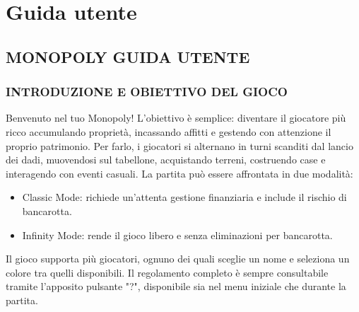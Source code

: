 \appendix
\chapter{Guida utente}
\section{MONOPOLY \- GUIDA UTENTE}
\subsection{INTRODUZIONE E OBIETTIVO DEL GIOCO}
Benvenuto nel tuo Monopoly!\newline
L’obiettivo è semplice: diventare il giocatore più ricco accumulando proprietà, incassando affitti e gestendo con attenzione il proprio patrimonio.
Per farlo, i giocatori si alternano in turni scanditi dal lancio dei dadi, muovendosi sul tabellone, acquistando terreni, costruendo case e interagendo con eventi casuali.\newline
La partita può essere affrontata in due modalità:\newline
\begin{itemize}
    \item Classic Mode: richiede un'attenta gestione finanziaria e include il rischio di bancarotta.
    \item Infinity Mode: rende il gioco libero e senza eliminazioni per bancarotta.  
\end{itemize}
Il gioco supporta più giocatori, ognuno dei quali sceglie un nome e seleziona un colore tra quelli disponibili.
Il regolamento completo è sempre consultabile tramite l’apposito pulsante "?", disponibile sia nel menu iniziale che durante la partita.
